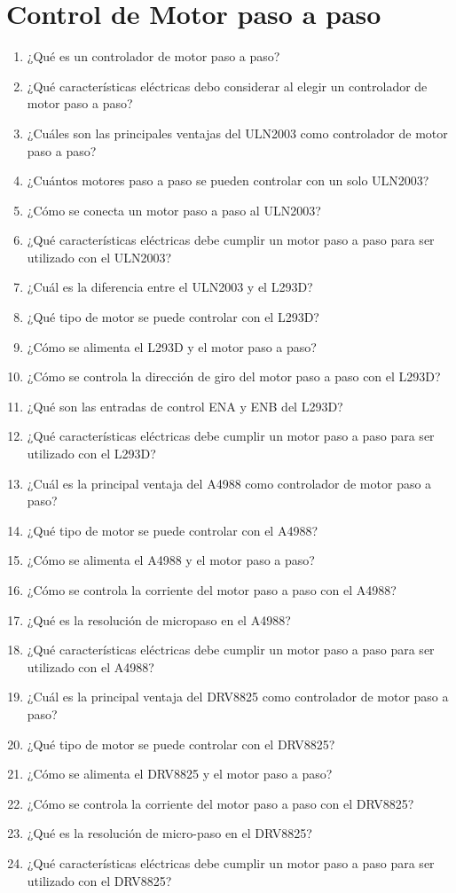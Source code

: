 \documentclass[../main]{subfiles}
\begin{document}
\chapter{Control de Motor paso a paso}
\begin{enumerate}
  \item ¿Qué es un controlador de motor paso a paso?
  \item ¿Qué características eléctricas debo considerar al elegir un
    controlador de motor paso a paso?
  \item ¿Cuáles son las principales ventajas del ULN2003 como
    controlador de motor paso a paso?
  \item ¿Cuántos motores paso a paso se pueden controlar con un solo ULN2003?
  \item ¿Cómo se conecta un motor paso a paso al ULN2003?
  \item ¿Qué características eléctricas debe cumplir un motor paso a
    paso para ser utilizado con el ULN2003?
  \item ¿Cuál es la diferencia entre el ULN2003 y el L293D?
  \item ¿Qué tipo de motor se puede controlar con el L293D?
  \item ¿Cómo se alimenta el L293D y el motor paso a paso?
  \item ¿Cómo se controla la dirección de giro del motor paso a paso
    con el L293D?
  \item ¿Qué son las entradas de control ENA y ENB del L293D?
  \item ¿Qué características eléctricas debe cumplir un motor paso a
    paso para ser utilizado con el L293D?
  \item ¿Cuál es la principal ventaja del A4988 como controlador de
    motor paso a paso?
  \item ¿Qué tipo de motor se puede controlar con el A4988?
  \item ¿Cómo se alimenta el A4988 y el motor paso a paso?
  \item ¿Cómo se controla la corriente del motor paso a paso con el A4988?
  \item ¿Qué es la resolución de micropaso en el A4988?
  \item ¿Qué características eléctricas debe cumplir un motor paso a
    paso para ser utilizado con el A4988?
  \item ¿Cuál es la principal ventaja del DRV8825 como controlador de
    motor paso a paso?
  \item ¿Qué tipo de motor se puede controlar con el DRV8825?
  \item ¿Cómo se alimenta el DRV8825 y el motor paso a paso?
  \item ¿Cómo se controla la corriente del motor paso a paso con el DRV8825?
  \item ¿Qué es la resolución de micro-paso en el DRV8825?
  \item ¿Qué características eléctricas debe cumplir un motor paso a
    paso para ser utilizado con el DRV8825?
\end{enumerate}
\end{document}
